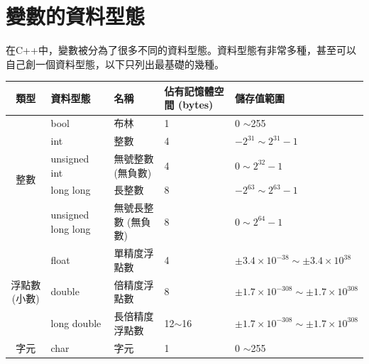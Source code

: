 \documentclass[a4paper, 11pt, oneside]{book}
\begin{document}
\section{變數的資料型態}
在C++中，變數被分為了很多不同的資料型態。資料型態有非常多種，甚至可以自己創一個資料型態，以下只列出最基礎的幾種。

\begin{table}[H]
    \begin{tabularx}{\linewidth}{|c|X|X|X|X|}
        \hline
        類型                           & 資料型態           & 名稱                & 佔有記憶體空間 (bytes) & 儲存值範圍                                              \\ \hline
        \multirow{5}{*}{整數}          & bool               & 布林                & 1                      & 0 $\sim$255                                             \\ \cline{2-5}
                                       & int                & 整數                & 4                      & $-2^{31} \sim 2^{31} - 1$                               \\ \cline{2-5}
                                       & unsigned int       & 無號整數 (無負數)   & 4                      & $0 \sim 2^{32} - 1$                                     \\ \cline{2-5}
                                       & long long          & 長整數              & 8                      & $-2^{63} \sim 2^{63} - 1$                               \\ \cline{2-5}
                                       & unsigned long long & 無號長整數 (無負數) & 8                      & $0 \sim 2^{64} - 1$                                     \\ \hline
        \multirow{3}{*}{浮點數 (小數)} & float              & 單精度浮點數        & 4                      & $\pm 3.4 \times 10^{-38} \sim \pm 3.4 \times 10^{38}$   \\ \cline{2-5}
                                       & double             & 倍精度浮點數        & 8                      & $\pm 1.7 \times 10^{-308} \sim \pm 1.7 \times 10^{308}$ \\ \cline{2-5}
                                       & long double        & 長倍精度浮點數      & 12$\sim$16             & $\pm 1.7 \times 10^{-308} \sim \pm 1.7 \times 10^{308}$ \\ \hline
        字元                           & char               & 字元                & 1                      & 0 $\sim$255                                             \\ \hline
    \end{tabularx}
\end{table}
\end{document}
